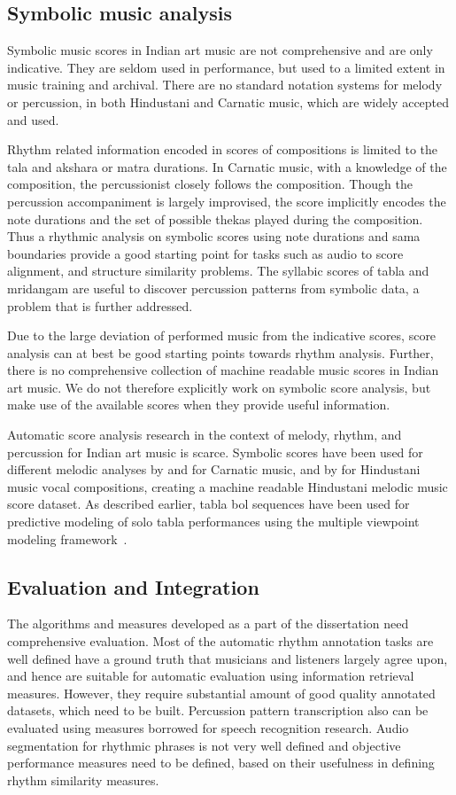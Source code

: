 \subsection{Symbolic music analysis}
Symbolic music scores in Indian art music are not comprehensive and are only indicative. They are seldom used in performance, but used to a limited extent in music training and archival. There are no standard notation systems for melody or percussion, in both Hindustani and Carnatic music, which are widely accepted and used. 

Rhythm related information encoded in scores of compositions is limited to the \gls{tala} and \gls{akshara} or \gls{matra} durations. In Carnatic music, with a knowledge of the composition, the percussionist closely follows the composition. Though the percussion accompaniment is largely improvised, the score implicitly encodes the note durations and the set of possible \glspl{theka} played during the composition. Thus a rhythmic analysis on symbolic scores using note durations and \gls{sama} boundaries provide a good starting point for tasks such as audio to score alignment, and structure similarity problems. The syllabic scores of \gls{tabla} and mridangam are useful to discover percussion patterns from symbolic data, a problem that is further addressed. 

Due to the large deviation of performed music from the indicative scores, score analysis can at best be good starting points towards rhythm analysis. Further, there is no comprehensive collection of machine readable music scores in Indian art music. We do not therefore explicitly work on symbolic score analysis, but make use of the available scores when they provide useful information. 

Automatic score analysis research in the context of melody, rhythm, and percussion for Indian art music is scarce. Symbolic scores have been used for different melodic analyses by  and  for Carnatic music, and by  for Hindustani music vocal compositions, creating a machine readable Hindustani melodic music score dataset. As described earlier, \gls{tabla} \gls{bol} sequences have been used for predictive modeling of solo \gls{tabla} performances using the multiple viewpoint modeling framework~\cite{chordia:10:mvmismir,chordia:10:mvmacm}. 
%
\subsection{Evaluation and Integration}
The algorithms and measures developed as a part of the dissertation need comprehensive evaluation. Most of the automatic rhythm annotation tasks are well defined have a ground truth that musicians and listeners largely agree upon, and hence are suitable for automatic evaluation using information retrieval measures. However, they require substantial amount of good quality annotated datasets, which need to be built. Percussion pattern transcription also can be evaluated using measures borrowed for speech recognition research. Audio segmentation for rhythmic phrases is not very well defined and objective performance measures need to be defined, based on their usefulness in defining rhythm similarity measures. 
 
